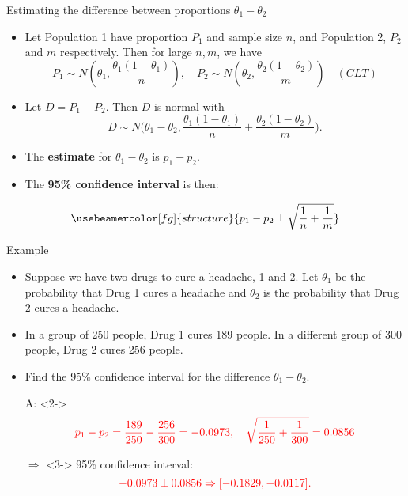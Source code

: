 \documentclass[10pt, xcolor=table]{beamer}
\newcommand*\themecol{\usebeamercolor[fg]{structure}}
\begin{document}
\begin{frame}{Estimating the difference between proportions $\theta_1 - \theta_2$}
\begin{itemize}
\setlength{\itemsep}{10pt}
\item Let Population 1 have proportion $P_1$ and sample size $n$, and Population 2, $P_2$ and $m$ respectively. Then for large $n,m$, we have 
{\small $$P_1 \sim N\left(\theta_1, \frac{\theta_1(1-\theta_1)}{n}\right),\quad  P_2\sim N\left(\theta_2, \frac{\theta_2(1-\theta_2)}{m}\right) \quad (CLT)$$}
\item Let $D = P_1 - P_2$. Then $D$ is normal with 
{\small $$ D \sim N\bigg(\theta_1 - \theta_2,  \frac{\theta_1(1-\theta_1)}{n} +  \frac{\theta_2(1-\theta_2)}{m}\bigg).$$}
\item The \textbf{estimate} for $\theta_1 - \theta_2$ is {\themecol $p_1 - p_2$}.
\item The \textbf{95\% confidence interval} is then:
\end{itemize}
\vspace*{-1ex}
\begin{align*}\themecol
{p_1 - p_2 \pm  \sqrt{ \frac{1}{n} +  \frac{1}{m}}}
\end{align*} 

\end{frame}

\begin{frame}{Example}
\begin{itemize}
\setlength{\itemsep}{10pt}
\item Suppose we have two drugs to cure a headache, 1 and 2. Let $\theta_1$ be the probability that Drug 1 cures a headache and $\theta_2$ is the probability that Drug 2 cures a headache. 
\item In a group of 250 people, Drug 1 cures 189 people. In a different group of 300 people, Drug 2 cures 256 people. 
\item Find the 95\% confidence interval for the difference $\theta_1 - \theta_2$.
\item[A:]<2->
$$\color{red} p_1 - p_2 = \frac{189}{250}- \frac{256}{300} =  -0.0973, \quad \sqrt{\frac{1}{250} + \frac{1}{300}} = 0.0856$$
\item[$\Rightarrow$]<3-> 95\% confidence interval:
$$\color{red} -0.0973  \pm 0.0856 \Rightarrow [-0.1829, -0.0117].$$
\end{itemize}

\end{frame}
\end{document}
